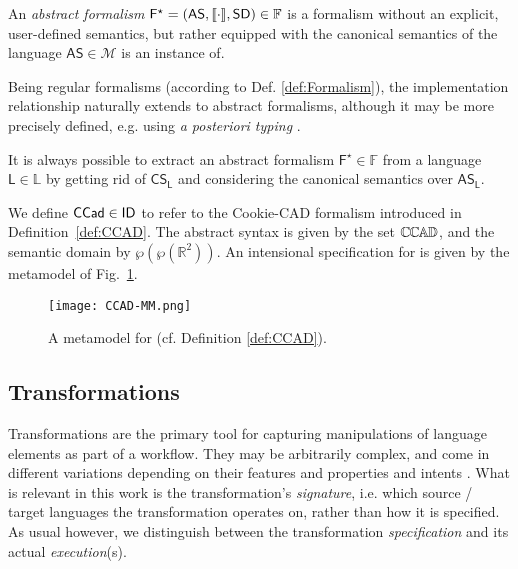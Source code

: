 \begin{olddef}
\begin{Definition}
   An \emph{abstract formalism} $\mathsf{F^\star} = 
(\mathsf{AS}, \llbracket \cdot \rrbracket, \mathsf{SD}) \in\mathbb{F}$ is a formalism without an 
explicit, user-defined semantics, but rather equipped with the canonical 
semantics of the language $\mathsf{AS}\in\mathcal{M}$ is an instance of.
\end{Definition}
Being regular formalisms (according to Def. \ref{def:Formalism}), the 
implementation relationship naturally extends to abstract formalisms, although 
it may be more precisely defined, e.g. using \emph{a posteriori typing} 
\cite{J:deLara-Guerra:2017}.

It is always possible to extract an abstract formalism  
$\mathsf{F^\star}\in\mathbb{F}$ from a language $\mathsf{L}\in\mathbb{L}$ by 
getting rid of $\mathsf{CS}_{\mathsf{L}}$ and considering the canonical 
semantics over $\mathsf{AS}_{\mathsf{L}}$.
\end{olddef}
\begin{newdef}
\begin{Example}
We define $\mathsf{CCad} \in \mathsf{ID}$ to refer to the Cookie-CAD formalism introduced in Definition~\ref{def:CCAD}. The abstract syntax is given by the set $\mathbb{C}\mskip-1mu\mathbb{C}\mskip-1mu\mathbb{A}\mskip-1mu\mathbb{D} $, and the semantic domain by $\wp(\wp(\mathbb{R}^ 2))$. 
An intensional specification for \CCad is given by the metamodel of Fig.~\ref{fig:PCAD-MM}.

\begin{figure}[t]
   \centering
   \texttt{[image: CCAD-MM.png]}
   \caption{A metamodel for \CCAD (cf. Definition 
\ref{def:CCAD}).}%
   \label{fig:PCAD-MM}%
\end{figure}
\end{Example}
\end{newdef}
\subsection{Transformations}
\label{sec:Formalisation-Transformation}

Transformations are the primary tool for capturing manipulations of language 
elements as part of a workflow. They may be arbitrarily complex, and come in 
different variations depending on their features \cite{J:Mens-VonGorp:2006} and 
properties and intents \cite{J:Lucio-Amrani-etAl:2014}. What is relevant in 
this work is the transformation's \emph{signature}, i.e. which source / target 
languages the transformation operates on, rather than how it is specified. As 
usual however, we distinguish between the transformation \emph{specification} 
and its actual \emph{execution}(s).

